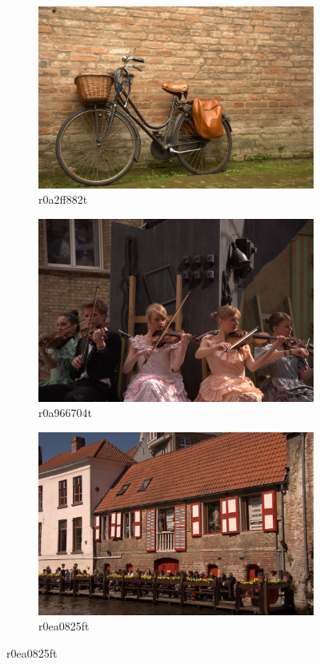 \documentclass{ipol}
\begin{document}
\begin{figure}[ht]
    \begin{subfigure}[c]{.31\linewidth}\centering
    \includegraphics[width=\linewidth]{images/original/r0a2ff882t.jpeg}
    \caption{r0a2ff882t}
    \end{subfigure}\hfill%
    \begin{subfigure}[c]{.31\linewidth}\centering
    \includegraphics[width=\linewidth]{images/original/r0a808003t.jpeg}
    \caption{r0a966704t}
    \end{subfigure}\hfill%
    \begin{subfigure}[c]{.31\linewidth}\centering
    \includegraphics[width=\linewidth]{images/original/r0a966704t.jpeg}
    \caption{r0ea0825ft}
    \end{subfigure}
    

\end{figure}
\end{document}

